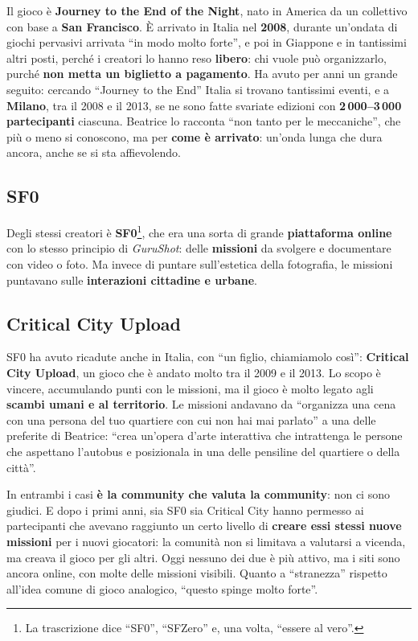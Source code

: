 Il gioco è \textbf{Journey to the End of the Night}, nato in America da un
collettivo con base a \textbf{San Francisco}. È arrivato in Italia nel
\textbf{2008}, durante un'ondata di giochi pervasivi arrivata ``in modo molto
forte'', e poi in Giappone e in tantissimi altri posti, perché i creatori lo
hanno reso \textbf{libero}: chi vuole può organizzarlo, purché \textbf{non metta
un biglietto a pagamento}. Ha avuto per anni un grande seguito: cercando
``Journey to the End'' Italia si trovano tantissimi eventi, e a \textbf{Milano},
tra il 2008 e il 2013, se ne sono fatte svariate edizioni con
\textbf{2\,000--3\,000 partecipanti} ciascuna. Beatrice lo racconta ``non tanto
per le meccaniche'', che più o meno si conoscono, ma per \textbf{come è
arrivato}: un'onda lunga che dura ancora, anche se si sta affievolendo.

\subsection{SF0}

Degli stessi creatori è \textbf{SF0}\footnote{La trascrizione dice ``SF0'',
``SFZero'' e, una volta, ``essere al vero''.}, che era una sorta di grande
\textbf{piattaforma online} con lo stesso principio di \emph{GuruShot}: delle
\textbf{missioni} da svolgere e documentare con video o foto. Ma invece di
puntare sull'estetica della fotografia, le missioni puntavano sulle
\textbf{interazioni cittadine e urbane}.

\subsection{Critical City Upload}

SF0 ha avuto ricadute anche in Italia, con ``un figlio, chiamiamolo così'':
\textbf{Critical City Upload}, un gioco che è andato molto tra il 2009 e il
2013. Lo scopo è vincere, accumulando punti con le missioni, ma il gioco è
molto legato agli \textbf{scambi umani e al territorio}. Le missioni andavano da
``organizza una cena con una persona del tuo quartiere con cui non hai mai
parlato'' a una delle preferite di Beatrice: ``crea un'opera d'arte interattiva
che intrattenga le persone che aspettano l'autobus e posizionala in una delle
pensiline del quartiere o della città''.

In entrambi i casi \textbf{è la community che valuta la community}: non ci sono
giudici. E dopo i primi anni, sia SF0 sia Critical City hanno permesso ai
partecipanti che avevano raggiunto un certo livello di \textbf{creare essi
stessi nuove missioni} per i nuovi giocatori: la comunità non si limitava a
valutarsi a vicenda, ma creava il gioco per gli altri. Oggi nessuno dei due è
più attivo, ma i siti sono ancora online, con molte delle missioni visibili.
Quanto a ``stranezza'' rispetto all'idea comune di gioco analogico, ``questo
spinge molto forte''.

